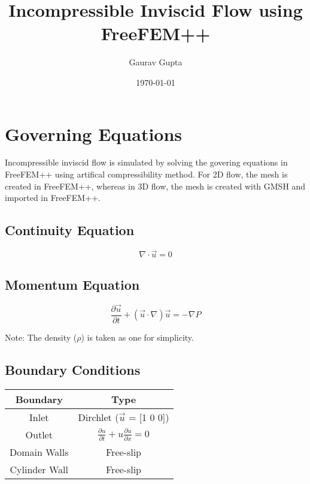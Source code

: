 \documentclass{article}
\title{\textbf{Incompressible Inviscid Flow using FreeFEM++}}
\author{Gaurav Gupta}
\date{\today}
\begin{document}
\maketitle %
\section{Governing Equations}
Incompressible inviscid flow is simulated by solving the govering equations in FreeFEM++
using artifical compressibility method. For 2D flow, the mesh is created in FreeFEM++, whereas
in 3D flow, the mesh is created with GMSH and imported in FreeFEM++.
\subsection*{Continuity Equation}
$$\nabla \cdot \vec{u}  = 0$$

\subsection*{Momentum Equation}
$$ \frac{\partial{\vec{u}}}{\partial{t}} + (\vec{u} \cdot \nabla) \vec{u} = - \nabla P $$

\noindent Note: The density ($\rho$) is taken as one for simplicity.

\subsection*{Boundary Conditions}
\renewcommand{\arraystretch}{1.5}
\begin{table}[H]
    \centering
    \begin{tabular}{||c|c||}
        \hline
        \textbf{Boundary} & \textbf{Type}                                                            \\
        \hline
        Inlet             & Dirchlet ($\vec{u}$ = [1 0 0])                                           \\
        \hline
        Outlet            & $\frac{\partial{u}}{\partial{t}} + u\frac{\partial{u}}{\partial{x}} = 0$ \\
        \hline
        Domain Walls      & Free-slip                                                                \\
        \hline
        Cylinder Wall     & Free-slip                                                                \\
        \hline
    \end{tabular}
\end{table}
\end{document}

